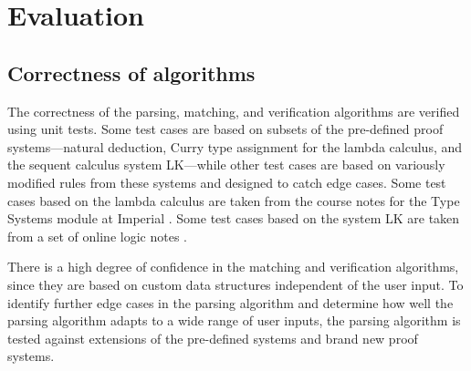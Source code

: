 \chapter{Evaluation}
\section{Correctness of algorithms}
The correctness of the parsing, matching, and verification algorithms are verified using unit tests. Some test cases are based on subsets of the pre-defined proof systems---natural deduction, Curry type assignment for the lambda calculus, and the sequent calculus system LK---while other test cases are based on variously modified rules from these systems and designed to catch edge cases. Some test cases based on the lambda calculus are taken from the course notes for the Type Systems module at Imperial \cite{van-bakel:2022}. Some test cases based on the system LK are taken from a set of online logic notes \cite{sequent}.

There is a high degree of confidence in the matching and verification algorithms, since they are based on custom data structures independent of the user input. To identify further edge cases in the parsing algorithm and determine how well the parsing algorithm adapts to a wide range of user inputs, the parsing algorithm is tested against extensions of the pre-defined systems and brand new proof systems.

